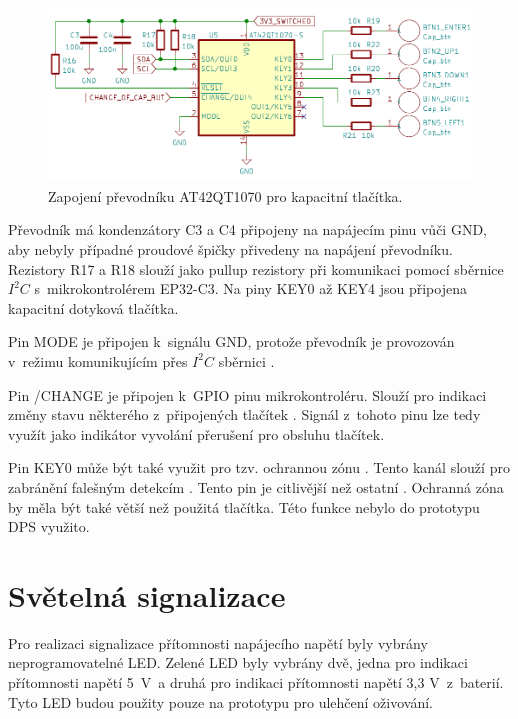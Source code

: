 \begin{figure}[!h]
  \begin{center}
    \includegraphics[scale=0.55]{obrazky/AT42QT1070.png}
  \end{center}
  \caption[Zapojení převodníku AT42QT1070 pro kapacitní tlačítka]{Zapojení převodníku AT42QT1070 pro kapacitní tlačítka.}
\end{figure}

Převodník má kondenzátory C3 a C4 připojeny na napájecím pinu vůči GND, aby nebyly případné proudové špičky přivedeny na napájení převodníku. Rezistory
R17 a R18 slouží jako pullup rezistory při komunikaci pomocí sběrnice $I^2C$ s~mikrokontrolérem EP32-C3. Na piny KEY0 až KEY4 jsou připojena kapacitní 
dotyková tlačítka. 

Pin MODE je připojen k~signálu GND, protože převodník je provozován v~režimu komunikujícím přes $I^2C$ sběrnici \cite{conv_cap_but_AT42QT1070_dtsh}.

Pin /CHANGE je připojen k~GPIO pinu mikrokontroléru. Slouží pro indikaci změny stavu některého z~připojených tlačítek \cite{conv_cap_but_AT42QT1070_dtsh}. 
Signál z~tohoto pinu lze tedy využít jako indikátor vyvolání přerušení pro obsluhu tlačítek. 

Pin KEY0 může být také využit pro tzv. ochrannou zónu \cite{conv_cap_but_AT42QT1070_dtsh}. Tento kanál slouží pro zabránění falešným 
detekcím \cite{conv_cap_but_AT42QT1070_dtsh}. Tento pin je citlivější než ostatní \cite{conv_cap_but_AT42QT1070_dtsh}. Ochranná zóna by měla být také větší 
než použitá tlačítka. Této funkce nebylo do prototypu DPS využito. 

\section{Světelná signalizace}
Pro realizaci signalizace přítomnosti napájecího napětí byly vybrány neprogramovatelné LED. Zelené LED byly vybrány dvě, jedna pro 
indikaci přítomnosti napětí 5~V~a druhá pro indikaci přítomnosti napětí 3,3 V~z~baterií. Tyto LED budou použity pouze na prototypu 
pro ulehčení oživování. 

